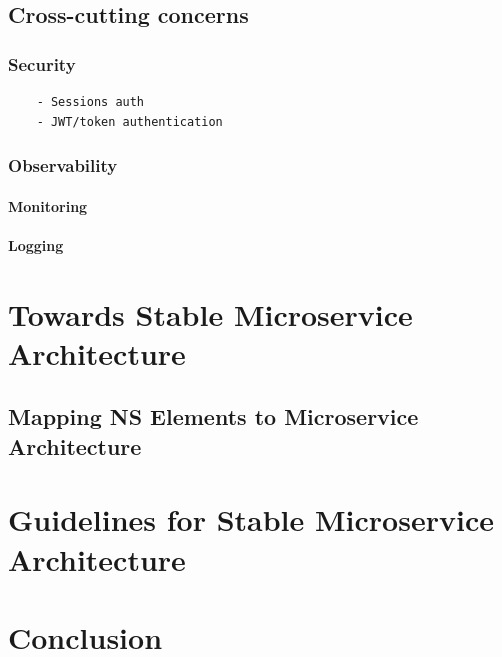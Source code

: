 \documentclass[thesis=M,english,hidelinks]{FITthesis}[2012/10/20]
\begin{document}
% 
%
\section{Cross-cutting concerns}
\subsection{Security}
\begin{verbatim}
    - Sessions auth
    - JWT/token authentication
\end{verbatim}


\subsection{Observability}
\subsubsection{Monitoring}
\subsubsection{Logging}


% 
% 

\chapter{Towards Stable Microservice Architecture}
\label{sec:msa_compliance}
\section{Mapping NS Elements to Microservice Architecture}


\chapter{Guidelines for Stable Microservice Architecture}
\label{sec:guidelines}

% 
% 
\chapter{Conclusion}
\label{sec:conclusion}
\end{document}
